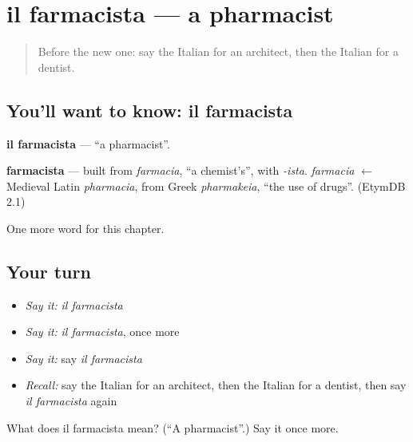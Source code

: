 \section[il farmacista]{il farmacista — a pharmacist}

\label{lesson:IT-C250-farmacista}



\begin{quote}
Before the new one: say the Italian for an architect, then the Italian for a dentist.
\end{quote}

\subsection*{You'll want to know: il farmacista}
\textbf{il farmacista} — \textquotedblleft{}a pharmacist\textquotedblright{}.

\begin{cousinweb}
\textbf{farmacista} — built from \emph{farmacia}, \textquotedblleft{}a chemist's\textquotedblright{}, with \emph{-ista}. \emph{farmacia} $\leftarrow$ Medieval Latin \emph{pharmacia}, from Greek \emph{pharmakeia}, \textquotedblleft{}the use of drugs\textquotedblright{}. (EtymDB 2.1)
\end{cousinweb}

\begin{grammarlens}[title={What you've built}]
One more word for this chapter.
\end{grammarlens}

\subsection*{Your turn}
\begin{itemize}
\raggedright
  \item \emph{Say it:} \emph{il farmacista}
  \item \emph{Say it:} \emph{il farmacista}, once more
  \item \emph{Say it:} say \emph{il farmacista}
  \item \emph{Recall:} say the Italian for an architect, then the Italian for a dentist, then say \emph{il farmacista} again
\end{itemize}

\begin{tcolorbox}[breakable,colback=teal!4,colframe=teal!35!black,title={Before you move on}]
What does il farmacista mean? (\textquotedblleft{}A pharmacist\textquotedblright{}.) Say it once more.
\end{tcolorbox}
